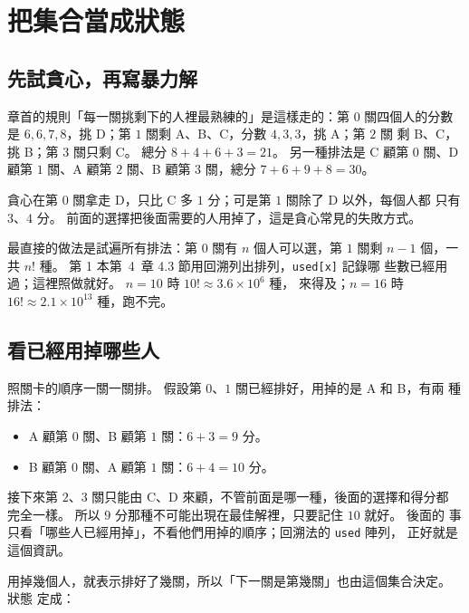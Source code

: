 \section{把集合當成狀態}
\label{sec:bm-set}

\subsection{先試貪心，再寫暴力解}

章首的規則「每一關挑剩下的人裡最熟練的」是這樣走的：第 $0$ 關四個人的分數
是 $6, 6, 7, 8$，挑 D；第 $1$ 關剩 A、B、C，分數 $4, 3, 3$，挑 A；第 $2$ 關
剩 B、C，挑 B；第 $3$ 關只剩 C。 總分 $8 + 4 + 6 + 3 = 21$。 另一種排法是
C 顧第 $0$ 關、D 顧第 $1$ 關、A 顧第 $2$ 關、B 顧第 $3$ 關，總分
$7 + 6 + 9 + 8 = 30$。

貪心在第 $0$ 關拿走 D，只比 C 多 $1$ 分；可是第 $1$ 關除了 D 以外，每個人都
只有 $3$、$4$ 分。 前面的選擇把後面需要的人用掉了，這是貪心常見的失敗方式。

最直接的做法是試遍所有排法：第 $0$ 關有 $n$ 個人可以選，第 $1$ 關剩 $n - 1$
個，一共 $n!$ 種。 第 1 本第~4~章 4.3 節用回溯列出排列，\texttt{used[x]} 記錄哪
些數已經用過；這裡照做就好。 $n = 10$ 時 $10! \approx 3.6 \times 10^6$ 種，
來得及；$n = 16$ 時 $16! \approx 2.1 \times 10^{13}$ 種，跑不完。

\subsection{看已經用掉哪些人}
\label{sec:bm-state}

照關卡的順序一關一關排。 假設第 $0$、$1$ 關已經排好，用掉的是 A 和 B，有兩
種排法：

\begin{itemize}
\item A 顧第 $0$ 關、B 顧第 $1$ 關：$6 + 3 = 9$ 分。
\item B 顧第 $0$ 關、A 顧第 $1$ 關：$6 + 4 = 10$ 分。
\end{itemize}

接下來第 $2$、$3$ 關只能由 C、D 來顧，不管前面是哪一種，後面的選擇和得分都
完全一樣。 所以 $9$ 分那種不可能出現在最佳解裡，只要記住 $10$ 就好。 後面的
事只看「哪些人已經用掉」，不看他們用掉的順序；回溯法的 \texttt{used} 陣列，
正好就是這個資訊。

用掉幾個人，就表示排好了幾關，所以「下一關是第幾關」也由這個集合決定。 狀態
定成：

\begin{center}
\end{center}

